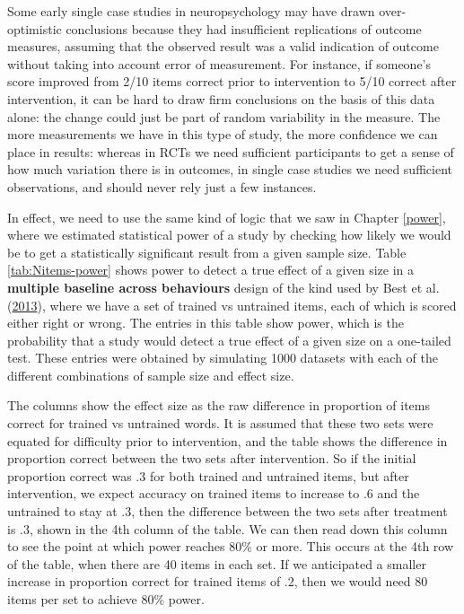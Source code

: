 \documentclass{krantz}
\begin{document}
Some early single case studies in neuropsychology may have drawn over-optimistic conclusions because they had insufficient replications of outcome measures, assuming that the observed result was a valid indication of outcome without taking into account error of measurement. For instance, if someone's score improved from 2/10 items correct prior to intervention to 5/10 correct after intervention, it can be hard to draw firm conclusions on the basis of this data alone: the change could just be part of random variability in the measure. The more measurements we have in this type of study, the more confidence we can place in results: whereas in RCTs we need sufficient participants to get a sense of how much variation there is in outcomes, in single case studies we need sufficient observations, and should never rely just a few instances.

In effect, we need to use the same kind of logic that we saw in Chapter \ref{power}, where we estimated statistical power of a study by checking how likely we would be to get a statistically significant result from a given sample size. Table \ref{tab:Nitems-power} shows power to detect a true effect of a given size in a \textbf{multiple baseline across behaviours} design of the kind used by Best et al. (\protect\hyperlink{ref-best2013}{2013}), where we have a set of trained vs untrained items, each of which is scored either right or wrong. The entries in this table show power, which is the probability that a study would detect a true effect of a given size on a one-tailed test. These entries were obtained by simulating 1000 datasets with each of the different combinations of sample size and effect size.

The columns show the effect size as the raw difference in proportion of items correct for trained vs untrained words. It is assumed that these two sets were equated for difficulty prior to intervention, and the table shows the difference in proportion correct between the two sets after intervention. So if the initial proportion correct was .3 for both trained and untrained items, but after intervention, we expect accuracy on trained items to increase to .6 and the untrained to stay at .3, then the difference between the two sets after treatment is .3, shown in the 4th column of the table. We can then read down this column to see the point at which power reaches 80\% or more. This occurs at the 4th row of the table, when there are 40 items in each set. If we anticipated a smaller increase in proportion correct for trained items of .2, then we would need 80 items per set to achieve 80\% power.
\end{document}
